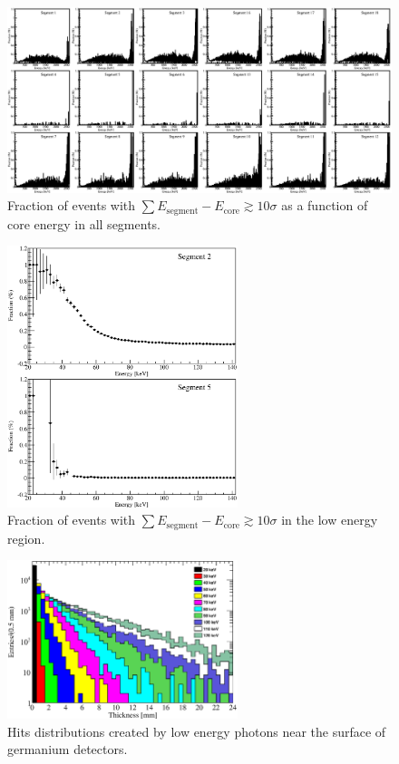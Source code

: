 \begin{figure}
\centering
\includegraphics{NegFractionAll}
\caption{Fraction of events with $\sum E_{\text{segment}} -
E_{\text{core}} \gtrsim 10\sigma$ as a function of core energy in all
segments.}
\label{fig:np:fracall}
\end{figure}

\begin{figure}[tphb]
\centering
\includegraphics[width=0.6\textwidth]{NegFraction20140}
\caption{Fraction of events with $\sum E_{\text{segment}} -
E_{\text{core}} \gtrsim 10\sigma$ in the low energy region.}
\label{fig:np:fraclow}
\end{figure}

\begin{figure}[tphb]
\centering
\includegraphics[width=0.6\textwidth]{gDepth}
\caption{Hits distributions created by low energy photons near the
surface of germanium detectors.}
\label{fig:np:gdep}
\end{figure}

